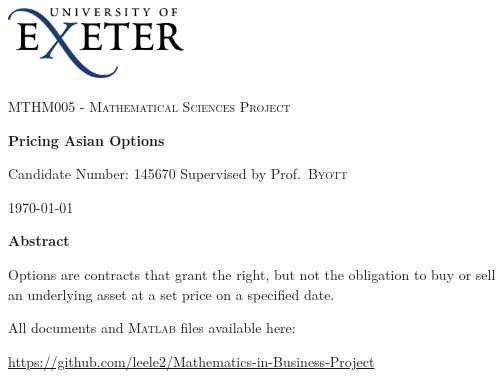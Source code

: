 \begin{titlepage}
	\centering
	\includegraphics[width=0.35\textwidth]{Title/logo.png} \par
	\vspace{0.25cm}
	{\scshape\Large MTHM005 - Mathematical Sciences Project\par}
	\vspace{0.5cm}
	{\huge\bfseries Pricing Asian Options\par}
    \vspace{0.10cm}
	{\Large Candidate Number: 145670}
	\vspace{0.2cm}
	\flushleft
	Supervised by	Prof.~\textsc{Byott} \hfill	{\large \today\par}
    \par
    \centering
	{\large \textbf{Abstract}}
	\par
    
Options are contracts that grant the right, but not the obligation to buy or sell an underlying asset at a set price on a specified date.
    

    \vfill
    All documents and \textsc{Matlab} files available here: \par \small{\url{https://github.com/leele2/Mathematics-in-Business-Project}}
\end{titlepage}